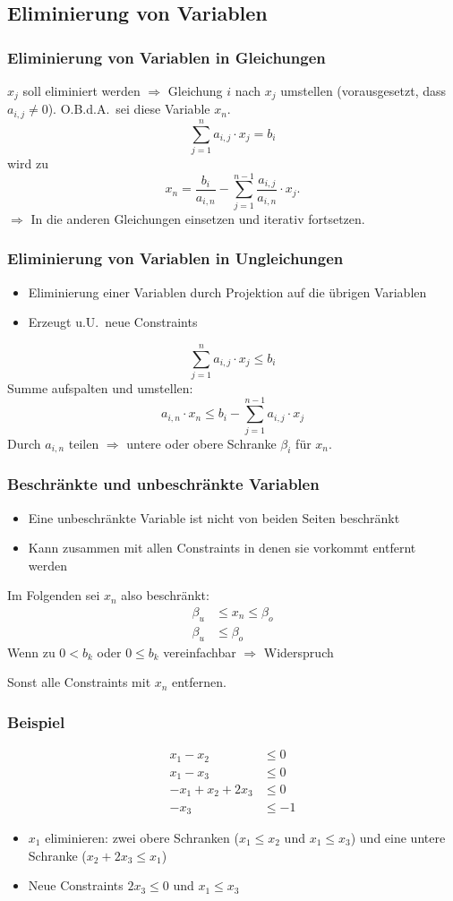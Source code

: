 \documentclass[hyperref={pdfpagelabels=false}]{beamer}
\begin{document}
\subsection{Eliminierung von Variablen}
\begin{frame}
	\frametitle{Eliminierung von Variablen in Gleichungen}
	$x_j$ soll eliminiert werden $\Rightarrow$ Gleichung $i$ nach $x_j$ umstellen (vorausgesetzt, dass $a_{i,j} \neq 0$). O.B.d.A.\ sei diese Variable $x_n$.
	\[ \sum_{j=1}^n a_{i,j} \cdot x_j = b_i \]
	wird zu
	\[ x_n = \frac{b_i}{a_{i,n}} - \sum_{j=1}^{n-1} \frac{a_{i,j}}{a_{i,n}} \cdot x_j. \]
	$\Rightarrow$ In die anderen Gleichungen einsetzen und iterativ fortsetzen.
\end{frame}
\begin{frame}
	\frametitle{Eliminierung von Variablen in Ungleichungen}
	\begin{itemize}
		\item Eliminierung einer Variablen durch Projektion auf die übrigen Variablen
		\item Erzeugt u.U.\ neue Constraints
	\end{itemize}
	\[ \sum_{j=1}^n a_{i,j} \cdot x_j \leq b_i \]
	Summe aufspalten und umstellen:
	\[ a_{i,n} \cdot x_n \leq b_i - \sum_{j=1}^{n-1} a_{i,j} \cdot x_j \]
	Durch $a_{i,n}$ teilen $\Rightarrow$ untere oder obere Schranke $\beta_i$ für $x_n$.
\end{frame}
\subtitle{Beschränkte und unbeschränkte Variablen}
\begin{frame}
	\frametitle{Beschränkte und unbeschränkte Variablen}
	\begin{itemize}
		\item Eine unbeschränkte Variable ist nicht von beiden Seiten beschränkt
		\item Kann zusammen mit allen Constraints in denen sie vorkommt entfernt werden
	\end{itemize}
	Im Folgenden sei $x_n$ also beschränkt:
	\begin{align*}
		\beta_u &\leq x_n \leq \beta_o \\
		\beta_u &\leq \beta_o
	\end{align*}
	Wenn zu $0 < b_k$ oder $0 \leq b_k$ vereinfachbar $\Rightarrow$ Widerspruch

	Sonst alle Constraints mit $x_n$ entfernen.
\end{frame}
\begin{frame}
	\frametitle{Beispiel}
	\begin{align*}
		x_1 - x_2 &\leq 0 \\
		x_1 - x_3 &\leq 0 \\
		-x_1 + x_2 + 2x_3 &\leq 0 \\
		-x_3 &\leq -1
	\end{align*}
	\begin{itemize}
		\item $x_1$ eliminieren: zwei obere Schranken ($x_1 \leq x_2$ und $x_1 \leq x_3$) und eine untere Schranke ($x_2 + 2x_3 \leq x_1$)
		\item Neue Constraints $2x_3 \leq 0$ und $x_1 \leq x_3$	
	\end{itemize}
\end{frame}
\end{document}
